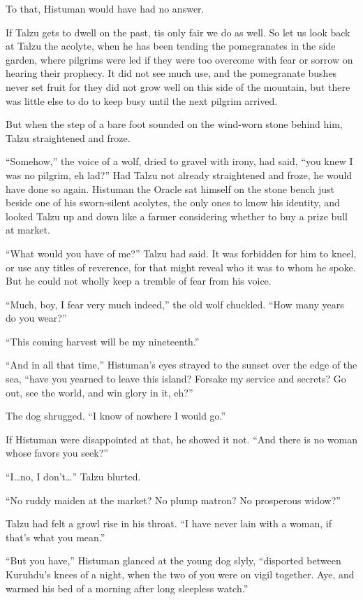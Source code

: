 To that, Histuman would have had no answer.

\secdiv

\noindent If Talzu gets to dwell on the past, tis only fair we do as well. So let us look back at Talzu the acolyte, when he has been tending the pomegranates in the side garden, where pilgrims were led if they were too overcome with fear or sorrow on hearing their prophecy. It did not see much use, and the pomegranate bushes never set fruit for they did not grow well on this side of the mountain, but there was little else to do to keep busy until the next pilgrim arrived.

But when the step of a bare foot sounded on the wind-worn stone behind him, Talzu straightened and froze.

``Somehow,'' the voice of a wolf, dried to gravel with irony, had said, ``you knew I was no pilgrim, eh lad?'' Had Talzu not already straightened and froze, he would have done so again. Histuman the Oracle sat himself on the stone bench just beside one of his sworn-silent acolytes, the only ones to know his identity, and looked Talzu up and down like a farmer considering whether to buy a prize bull at market.

``What would you have of me?'' Talzu had said. It was forbidden for him to kneel, or use any titles of reverence, for that might reveal who it was to whom he spoke. But he could not wholly keep a tremble of fear from his voice.

``Much, boy, I fear very much indeed,'' the old wolf chuckled. ``How many years do you wear?''

``This coming harvest will be my nineteenth.''

``And in all that time,'' Histuman's eyes strayed to the sunset over the edge of the sea, ``have you yearned to leave this island? Forsake my service and secrets? Go out, see the world, and win glory in it, eh?''

The dog shrugged. ``I know of nowhere I would go.''

If Histuman were disappointed at that, he showed it not. ``And there is no woman whose favors you seek?''

``I\ldots{}no, I don't\ldots'' Talzu blurted.

``No ruddy maiden at the market? No plump matron? No prosperous widow?''

Talzu had felt a growl rise in his throat. ``I have never lain with a woman, if that's what you mean.''

``But you have,'' Histuman glanced at the young dog slyly, ``disported between Kuruhdu's knees of a night, when the two of you were on vigil together. Aye, and warmed his bed of a morning after long sleepless watch.''

